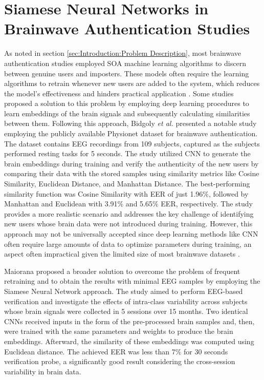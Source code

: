 \section{Siamese Neural Networks in Brainwave Authentication Studies}
\label{sec:Related Work:Siamese Neural Networks in Brainwave Authentication Studies}
   As noted in section \ref{sec:Introduction:Problem Description}, most brainwave authentication studies employed SOA machine learning algorithms to discern between genuine users and imposters. These models often require the learning algorithms to retrain whenever new users are added to the system, which reduces the model's effectiveness and hinders practical application \cite{fallahi2023brainnet}. 
    Some studies proposed a solution to this problem by employing deep learning procedures to learn embeddings of the brain signals and subsequently calculating similarities between them. Following this approach, Bidgoly \textit{et al.} \cite{bidgoly2022towards} presented a notable study employing the publicly available Physionet dataset \cite{Phsionet} for brainwave authentication. The dataset contains EEG recordings from 109 subjects, captured as the subjects performed resting tasks for 5 seconds. The study utilized CNN to generate the brain embeddings during training and verify the authenticity of the new users by comparing their data with the stored samples using similarity metrics like Cosine Similarity, Euclidean Distance, and Manhattan Distance.
    The best-performing similarity function was Cosine Similarity with EER of just 1.96$\%$, followed by Manhattan and Euclidean with 3.91$\%$ and 5.65$\%$ EER, respectively. The study provides a more realistic scenario and addresses the key challenge of identifying new users whose brain data were not introduced during training. However, this approach may not be universally accepted since deep learning methods like CNN often require large amounts of data to optimize parameters during training, an aspect often impractical given the limited size of most brainwave datasets \cite{lotte2018review}.
    \smallskip
    
    Maiorana \cite{maiorana2019eeg} proposed a broader solution to overcome the problem of frequent retraining and to obtain the results with minimal EEG samples by employing the Siamese Neural Network approach. The study aimed to perform EEG-based verification and investigate the effects of intra-class variability across subjects whose brain signals were collected in 5 sessions over 15 months. Two identical CNNs received inputs in the form of the pre-processed brain samples and, then, were trained with the same parameters and weights to produce the brain embeddings. Afterward, the similarity of these embeddings was computed using Euclidean distance. The achieved EER was less than 7$\%$ for 30 seconds verification probe, a significantly good result considering the cross-session variability in brain data.
    \smallskip
    
